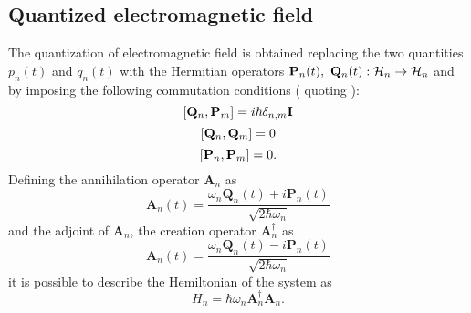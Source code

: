     \subsection{Quantized electromagnetic field}
        The quantization of electromagnetic field is obtained replacing the two quantities 
        $p_n(t)$ and $q_n(t)$ with the Hermitian operators 
        $\mathbf{P}_n(t),\ \mathbf{Q}_n(t):\Hilbert_n\to\Hilbert_n$ and by imposing the following
        commutation conditions (\cite{tesiGuerrini} quoting \cite{quantumRad_Louissel,quantumOptic_Mandel}):
        \begin{equation}
            \commutator{\mathbf{Q}_n}{\mathbf{P}_m}=i\hbar\delta_{n,m}\mathbf{I}
        \end{equation}
        \begin{equation}
            \commutator{\mathbf{Q}_n}{\mathbf{Q}_m}=0
        \end{equation}
        \begin{equation}
            \commutator{\mathbf{P}_n}{\mathbf{P}_m}=0.
        \end{equation}
        Defining the annihilation operator $\mathbf{A}_n$ as
        \begin{equation}
            \mathbf{A}_n(t)=\frac{\omega_n\mathbf{Q}_n(t)+i\mathbf{P}_n(t)}{\sqrt{2\hbar\omega_n}}
            \label{eq:QEF.1}
        \end{equation} 
        and the adjoint of $\mathbf{A}_n$, the creation operator $\mathbf{A}_n^\dagger$ as
        \begin{equation}
            \mathbf{A}_n(t)=\frac{\omega_n\mathbf{Q}_n(t)-i\mathbf{P}_n(t)}{\sqrt{2\hbar\omega_n}}
            \label{eq:QEF.2}
        \end{equation}
        it is possible to describe the Hemiltonian of the system as
        \begin{equation}
            H_n=\hbar\omega_n\mathbf{A}_n^\dagger\mathbf{A}_n.
            \label{eq:QEF.3}
        \end{equation}

